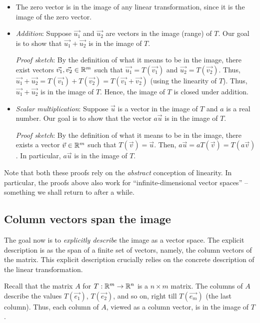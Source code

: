 \documentclass[10pt]{amsart}
\begin{document}
\begin{itemize}
\item The zero vector is in the image of any linear transformation,
  since it is the image of the zero vector.
\item {\em Addition}: Suppose $\vec{u_1}$ and $\vec{u_2}$ are vectors
  in the image (range) of $T$. Our goal is to show that $\vec{u_1} +
  \vec{u_2}$ is in the image of $T$.

  {\em Proof sketch}: By the definition of what it means to be in the
  image, there exist vectors $\vec{v_1}, \vec{v_2} \in \mathbb{R}^m$ such that
  $\vec{u_1} = T(\vec{v_1})$ and $\vec{u_2} = T(\vec{v_2})$. Thus,
  $\vec{u_1} + \vec{u_2} = T(\vec{v_1}) + T(\vec{v_2}) = T(\vec{v_1} +
  \vec{v_2})$ (using the linearity of $T$). Thus, $\vec{u_1} +
  \vec{u_2}$ is in the image of $T$. Hence, the image of $T$ is closed
  under addition.
\item {\em Scalar multiplication}: Suppose $\vec{u}$ is a vector in
  the image of $T$ and $a$ is a real number. Our goal is to show
  that the vector $a\vec{u}$ is in the image of $T$.

  {\em Proof sketch}: By the definition of what it means to be in the
  image, there exists a vector $\vec{v} \in \mathbb{R}^m$ such that
  $T(\vec{v}) = \vec{u}$. Then, $a\vec{u} = a T(\vec{v})
  = T(a \vec{v})$. In particular, $a\vec{u}$ is in the image of $T$.
\end{itemize}

Note that both these proofs rely on the {\em abstract} conception of
linearity. In particular, the proofs above also work for
``infinite-dimensional vector spaces'' -- something we shall return to
after a while.

\subsection{Column vectors span the image}

The goal now is to {\em explicitly describe} the image as a vector
space. The explicit description is as the span of a finite set of
vectors, namely, the column vectors of the matrix. This explicit
description crucially relies on the concrete description of the linear
transformation.

Recall that the matrix $A$ for $T:\mathbb{R}^m \to \mathbb{R}^n$ is a $n \times m$
matrix. The columns of $A$ describe the values $T(\vec{e_1})$,
$T(\vec{e_2})$, and so on, right till $T(\vec{e_m})$ (the last
column). Thus, each column of $A$, viewed as a column vector, is in
the image of $T$.
\end{document}
